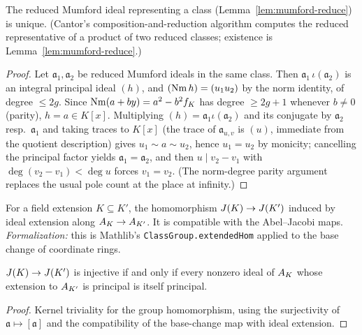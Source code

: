 \begin{lemma}
\label{lem:mumford-exists}
\leanok
{}
The reduced Mumford ideal representing a class (Lemma~\ref{lem:mumford-reduce}) is
unique. (Cantor's composition-and-reduction algorithm computes the reduced
representative of a product of two reduced classes; existence is
Lemma~\ref{lem:mumford-reduce}.)
\end{lemma}
\begin{proof}
\leanok
Let $\mathfrak a_1, \mathfrak a_2$ be reduced Mumford ideals in the same class. Then
$\mathfrak a_1\,\iota(\mathfrak a_2)$ is an integral principal ideal $(h)$, and
$(\operatorname{Nm} h) = (u_1 u_2)$ by the norm identity, of degree $\le 2g$. Since $\operatorname{Nm}(a + by) =
a^2 - b^2 f_K$ has degree $\ge 2g+1$ whenever $b \ne 0$ (parity), $h = a \in K[x]$.
Multiplying $(h) = \mathfrak a_1 \iota(\mathfrak a_2)$ and its conjugate by
$\mathfrak a_2$ resp.\ $\mathfrak a_1$ and taking traces to $K[x]$ (the trace of
$\mathfrak a_{u,v}$ is $(u)$, immediate from the quotient description) gives
$u_1 \sim a \sim u_2$, hence $u_1 = u_2$ by monicity; cancelling the principal factor
yields $\mathfrak a_1 = \mathfrak a_2$, and then $u \mid v_2 - v_1$ with
$\deg(v_2 - v_1) < \deg u$ forces $v_1 = v_2$. (The norm-degree parity argument
replaces the usual pole count at the place at infinity.)
\end{proof}

\begin{definition}
\label{def:basechange}
\leanok
{}
For a field extension $K \subseteq K'$, the homomorphism $J(K) \to J(K')$ induced by
ideal extension along $A_{K} \to A_{K'}$. It is compatible with the Abel--Jacobi maps.
\emph{Formalization:} this is Mathlib's \texttt{ClassGroup.extendedHom} applied to the
base change of coordinate rings.
\end{definition}

\begin{lemma}
\label{lem:basechange-crit}
\leanok
{}
$J(K) \to J(K')$ is injective if and only if every nonzero ideal of $A_{K}$ whose
extension to $A_{K'}$ is principal is itself principal.
\end{lemma}
\begin{proof}
\leanok
Kernel triviality for the group homomorphism, using the surjectivity of
$\mathfrak a \mapsto [\mathfrak a]$ and the compatibility of the base-change map with
ideal extension.
\end{proof}

